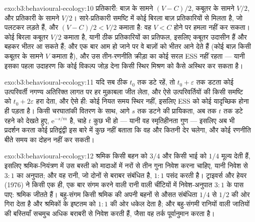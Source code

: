 \begin{solution}{exo:b3:behavioural-ecology:10}
प्रतिकारी: बाज़ के सामने $(V - C)/2$, कबूतर के सामने $V/2$, और
प्रतिकारी के सामने $V/2$। सारे-प्रतिकारी समष्टि में कोई बिरला बाज़
प्रतिकारियों से मिलता है, जो पलटकर लड़ते हैं, और $(V - C)/2 < V/2$
कमाता है: वह $V < C$ होने पर हमला नहीं कर सकता। कोई बिरला कबूतर
$V/2$ कमाता है, यानी ठीक प्रतिकारियों का प्रतिफल, इसलिए कबूतर उदासीन
हैं और बहकर भीतर आ सकते हैं; और एक बार आम हो जाने पर वे बाज़ों को भीतर
आने देते हैं (कोई बाज़ किसी कबूतर के सामने $V$ कमाता है), और उस
तीन-रणनीति क्रीड़ा का कोई सरल ESS नहीं रहता --- यानी इसका पहला उदाहरण कि
कोई विकल्प जोड़ देना किसी स्थिर मिश्रण को कैसे अस्थिर कर सकता है।
\end{solution}

\begin{solution}{exo:b3:behavioural-ecology:11}
यदि सब ठीक $t_{0}$ तक डटे रहें, तो $t_{0} +
\varepsilon$ तक डटता कोई उत्परिवर्ती नगण्य अतिरिक्त लागत पर हर मुक़ाबला
जीत लेता, और ऐसे उत्परिवर्तियों की किसी समष्टि को $t_{0} + 2\varepsilon$
हरा देता, और ऐसे ही: कोई नियत समय स्थिर नहीं, इसलिए ESS को कोई
यादृच्छिक होना ही पड़ता है। किसी चरघातांकी वितरण के साथ, आगे $s$ तक डटने की प्रायिकता, अब तक
$t$ तक डटे रहने को देखते हुए, $\mathrm{e}^{-s/m}$ है, चाहे
$t$ कुछ भी हो --- यानी वह स्मृतिहीनता गुण --- इसलिए अब भी प्रदर्शन करता
कोई प्रतिद्वंद्वी इस बारे में कुछ नहीं बताता कि वह और कितनी देर चलेगा,
और कोई रणनीति बीते समय का दोहन नहीं कर सकती।
\end{solution}

\begin{solution}{exo:b3:behavioural-ecology:12}
श्रमिक किसी बहन को $3/4$ और किसी भाई को $1/4$ मूल्य देती हैं, इसलिए
श्रमिक-नियंत्रण में उस बस्ती को मादाओं में नरों से तीन गुना निवेश करना
चाहिए, यानी निवेश से $3{:}1$ का अनुपात; और वह रानी, जो दोनों से बराबर
संबंधित है, $1{:}1$ पसंद करती है। ट्राइवर्स और हेयर (1976) ने किसी एक
ही, एक बार संगम करने वाली रानी वाली चींटियों में निवेश-अनुपात
$3{:}1$ के पास पाए: श्रमिक जीतते हैं। बहु-संगम किसी श्रमिक की अपनी बहनों
से औसत संबंधिता $1/4$ से $1/2$ की ओर गिरा देता है और श्रमिकों के इष्टतम
को $1{:}1$ की ओर धकेल देता है; और बहु-संगमी रानियों वाली जातियों की
बस्तियाँ सचमुच अधिक बराबरी से निवेश करती हैं, जैसा वह तर्क पूर्वानुमान
करता है।
\end{solution}

